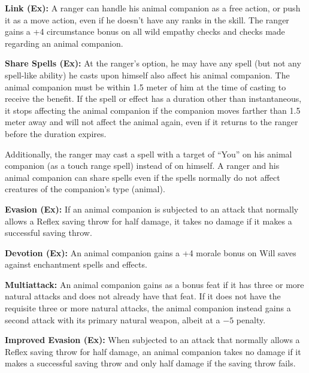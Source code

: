 \textbf{Link (Ex):} A ranger can handle his animal companion as a free action, or push it as a move action, even if he doesn't have any ranks in the  skill. The ranger gains a +4 circumstance bonus on all wild empathy checks and  checks made regarding an animal companion.

\textbf{Share Spells (Ex):} At the ranger's option, he may have any spell (but not any spell-like ability) he casts upon himself also affect his animal companion. The animal companion must be within 1.5 meter of him at the time of casting to receive the benefit. If the spell or effect has a duration other than instantaneous, it stops affecting the animal companion if the companion moves farther than 1.5 meter away and will not affect the animal again, even if it returns to the ranger before the duration expires.

Additionally, the ranger may cast a spell with a target of ``You'' on his animal companion (as a touch range spell) instead of on himself. A ranger and his animal companion can share spells even if the spells normally do not affect creatures of the companion's type (animal).

\textbf{Evasion (Ex):} If an animal companion is subjected to an attack that normally allows a Reflex saving throw for half damage, it takes no damage if it makes a successful saving throw.

\textbf{Devotion (Ex):} An animal companion gains a +4 morale bonus on Will saves against enchantment spells and effects.

\textbf{Multiattack:} An animal companion gains  as a bonus feat if it has three or more natural attacks and does not already have that feat. If it does not have the requisite three or more natural attacks, the animal companion instead gains a second attack with its primary natural weapon, albeit at a $-5$ penalty.

\textbf{Improved Evasion (Ex):} When subjected to an attack that normally allows a Reflex saving throw for half damage, an animal companion takes no damage if it makes a successful saving throw and only half damage if the saving throw fails.


